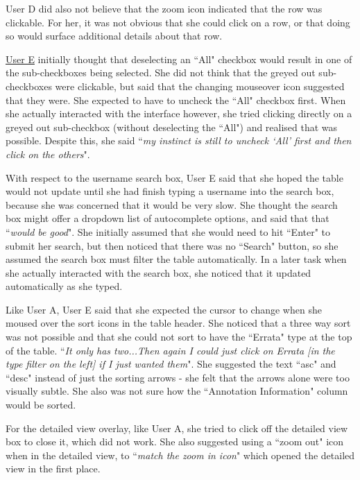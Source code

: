 User D did also not believe that the zoom icon indicated that the row was clickable. For her, it was not obvious that she could click on a row, or that doing so would surface additional details about that row. 

\underline{User E} initially thought that deselecting an ``All" checkbox would result in one of the sub-checkboxes being selected. She did not think that the greyed out sub-checkboxes were clickable, but said that the changing mouseover icon suggested that they were. She expected to have to uncheck the ``All" checkbox first. When she actually interacted with the interface however, she tried clicking directly on a greyed out sub-checkbox (without deselecting the ``All") and realised that was possible. Despite this, she said ``\textit{my instinct is still to uncheck ‘All' first and then click on the others}".

With respect to the username search box, User E said that she hoped the table would not update until she had finish typing a username into the search box, because she was concerned that it would be very slow. She thought the search box might offer a dropdown list of autocomplete options, and said that that ``\textit{would be good}". She initially assumed that she would need to hit ``Enter" to submit her search, but then noticed that there was no ``Search" button, so she assumed the search box must filter the table automatically. In a later task when she actually interacted with the search box, she noticed that it updated automatically as she typed. 

Like User A, User E said that she expected the cursor to change when she moused over the sort icons in the table header. She noticed that a three way sort was not possible and that she could not sort to have the ``Errata" type at the top of the table. ``\textit{It only has two...Then again I could just click on Errata [in the type filter on the left] if I just wanted them}". She suggested the text ``asc" and ``desc" instead of just the sorting arrows - she felt that the arrows alone were too visually subtle. She also was not sure how the ``Annotation Information" column would be sorted. 

For the detailed view overlay, like User A, she tried to click off the detailed view box to close it, which did not work. She also suggested using a ``zoom out" icon when in the detailed view, to ``\textit{match the zoom in icon}" which opened the detailed view in the first place. 

